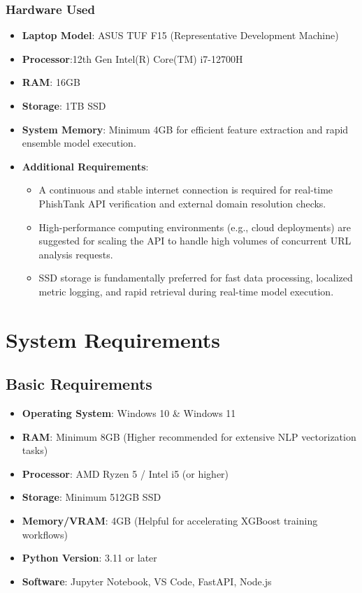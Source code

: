 \subsubsection*{Hardware Used}

\begin{itemize}
\item \textbf{Laptop Model}: ASUS TUF F15 (Representative Development Machine)
\item \textbf{Processor}:12th Gen Intel(R) Core(TM) i7-12700H
\item \textbf{RAM}: 16GB 
\item \textbf{Storage}: 1TB SSD
\item \textbf{System Memory}: Minimum 4GB for efficient feature extraction and rapid ensemble model execution.
\item \textbf{Additional Requirements}:
\begin{itemize}
\item A continuous and stable internet connection is required for real-time PhishTank API verification and external domain resolution checks.
\item High-performance computing environments (e.g., cloud deployments) are suggested for scaling the API to handle high volumes of concurrent URL analysis requests.
\item SSD storage is fundamentally preferred for fast data processing, localized metric logging, and rapid retrieval during real-time model execution.
\end{itemize}
\end{itemize}


\section{System Requirements}

\subsection{Basic Requirements}

\begin{itemize}
\item \textbf{Operating System}: Windows 10 \& Windows 11
\item \textbf{RAM}: Minimum 8GB (Higher recommended for extensive NLP vectorization tasks)
\item \textbf{Processor}: AMD Ryzen 5 / Intel i5 (or higher)
\item \textbf{Storage}: Minimum 512GB SSD
\item \textbf{Memory/VRAM}: 4GB (Helpful for accelerating XGBoost training workflows)
\item \textbf{Python Version}: 3.11 or later
\item \textbf{Software}: Jupyter Notebook, VS Code, FastAPI, Node.js
\end{itemize}

